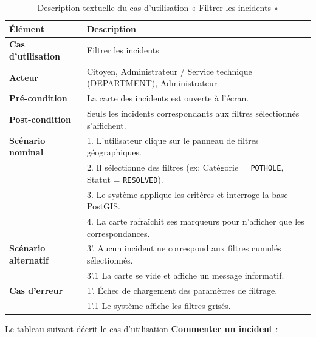 \begin{table}[H]
    \centering
    \caption{Description textuelle du cas d'utilisation « Filtrer les incidents »}
    \label{tab:txt_filtre}
    \vspace{0.2cm}
    \small
    \begin{tabularx}{\textwidth}{|l|X|}
        \hline
        \textbf{Élément} & \textbf{Description} \\ \hline
        \textbf{Cas d’utilisation} & Filtrer les incidents \\ \hline
        \textbf{Acteur} & Citoyen, Administrateur / Service technique (DEPARTMENT), Administrateur \\ \hline
        \textbf{Pré-condition} & La carte des incidents est ouverte à l'écran. \\ \hline
        \textbf{Post-condition} & Seuls les incidents correspondants aux filtres sélectionnés s'affichent. \\ \hline
        \textbf{Scénario nominal} &
        1. L'utilisateur clique sur le panneau de filtres géographiques.\\
        & 2. Il sélectionne des filtres (ex: Catégorie = \texttt{POTHOLE}, Statut = \texttt{RESOLVED}).\\
        & 3. Le système applique les critères et interroge la base PostGIS.\\
        & 4. La carte rafraîchit ses marqueurs pour n'afficher que les correspondances. \\ \hline
        \textbf{Scénario alternatif} &
        3'. Aucun incident ne correspond aux filtres cumulés sélectionnés.\\
        & 3'.1 La carte se vide et affiche un message informatif. \\ \hline
        \textbf{Cas d’erreur} &
        1'. Échec de chargement des paramètres de filtrage.\\
        & 1'.1 Le système affiche les filtres grisés. \\ \hline
    \end{tabularx}
\end{table}

Le tableau suivant décrit le cas d'utilisation \textbf{\og Commenter un incident \fg{}} :

